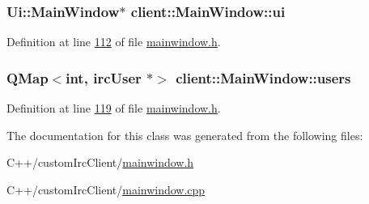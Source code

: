 \hypertarget{classclient_1_1_main_window_a2ec3641144030d30cd5358d33576c06c}{
\subsubsection[{ui}]{\setlength{\rightskip}{0pt plus 5cm}Ui\-::\-Main\-Window$\ast$ client\-::\-Main\-Window\-::ui\hspace{0.3cm}{\ttfamily [private]}}}\label{d2/da4/classclient_1_1_main_window_a2ec3641144030d30cd5358d33576c06c}


Definition at line \hyperlink{mainwindow_8h_source_l00112}{112} of file \hyperlink{mainwindow_8h_source}{mainwindow.\-h}.

\hypertarget{classclient_1_1_main_window_a1b6893fbe6201f0ab9d6e94695834bb5}{
\subsubsection[{users}]{\setlength{\rightskip}{0pt plus 5cm}Q\-Map$<$int, {\bf irc\-User} $\ast$$>$ client\-::\-Main\-Window\-::users\hspace{0.3cm}{\ttfamily [private]}}}\label{d2/da4/classclient_1_1_main_window_a1b6893fbe6201f0ab9d6e94695834bb5}


Definition at line \hyperlink{mainwindow_8h_source_l00119}{119} of file \hyperlink{mainwindow_8h_source}{mainwindow.\-h}.



The documentation for this class was generated from the following files\-:\begin{DoxyCompactItemize}
\item 
C++/custom\-Irc\-Client/\hyperlink{mainwindow_8h}{mainwindow.\-h}\item 
C++/custom\-Irc\-Client/\hyperlink{mainwindow_8cpp}{mainwindow.\-cpp}\end{DoxyCompactItemize}
